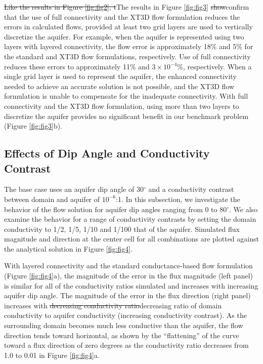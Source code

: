 \documentclass{article}
\begin{document}
{\color{red} \sout{Like the results in Figure \ref{fig:fig2}, t}T}he results in Figure \ref{fig:fig3} {\color{red} \sout{show}confirm} that the use of full connectivity and the XT3D flow formulation reduces the errors in calculated flows, provided at least two grid layers are used to vertically discretize the aquifer. {\color{red}For example, when the aquifer is represented using two layers with layered connectivity, the flow error is approximately 18\% and 5\% for the standard and XT3D flow formulations, respectively. Use of full connectivity reduces these errors to approximately 11\% and $3 \times 10^{-4}$\%, respectively.} When a single grid layer is used to represent the aquifer, the enhanced connectivity needed to achieve an accurate solution is not possible, and the XT3D flow formulation is unable to compensate for the inadequate connectivity. {\color{red} With full connectivity and the XT3D flow formulation, using more than two layers to discretize the aquifer provides no significant benefit in our benchmark problem (Figure \ref{fig:fig3}b).}

\subsection*{Effects of Dip Angle and Conductivity Contrast}

The base case uses an aquifer dip angle of 30$^{\circ}$ and a conductivity contrast between domain and aquifer of $10^{-6}$:1. In this subsection, we investigate the behavior of the flow solution for aquifer dip angles ranging from 0 to 80$^{\circ}$. We also examine the behavior for a range of conductivity contrasts by setting the domain conductivity to 1/2, 1/5, 1/10 and 1/100 that of the aquifer. Simulated flux magnitude and direction at the center cell for all combinations are plotted against the analytical solution in Figure \ref{fig:fig4}. 

With layered connectivity and the standard conductance-based flow formulation (Figure \ref{fig:fig4}a), the magnitude of the error in the flux magnitude (left panel) is similar for all of the conductivity ratios simulated and increases with increasing aquifer dip angle. The magnitude of the error in the flux direction (right panel) increases with {\color{red} \sout{decreasing conductivity ratio}decreasing ratio of domain conductivity to aquifer conductivity (increasing conductivity contrast)}. As the surrounding domain becomes much less conductive than the aquifer, the flow direction tends toward horizontal{\color{red}, as shown by the ``flattening'' of the curve toward a flux direction of zero degrees as the conductivity ratio decreases from 1.0 to 0.01 in Figure \ref{fig:fig4}a}.
\end{document}
